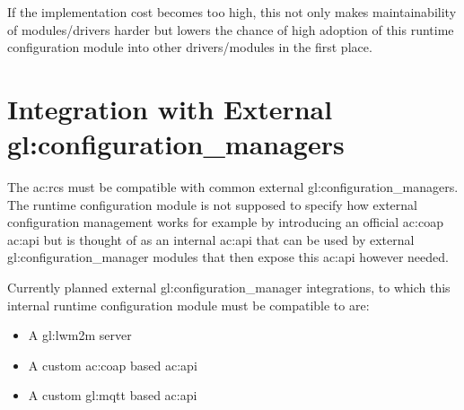 If the implementation cost becomes too high, this not only makes maintainability of modules/drivers harder but lowers the chance of high adoption of this runtime configuration module into other drivers/modules in the first place.

\section{Integration with External \glspl*{gl:configuration_manager}}
\label{sec:requirements:integration_with_external_configuration_managers}

The \gls{ac:rcs} must be compatible with common external \glspl{gl:configuration_manager}.
The runtime configuration module is not supposed to specify how external configuration management works for example by introducing an official \gls{ac:coap} \gls{ac:api} but is thought of as an internal \gls{ac:api} that can be used by external \gls{gl:configuration_manager} modules that then expose this \gls{ac:api} however needed.

Currently planned external \gls{gl:configuration_manager} integrations, to which this internal
runtime configuration module must be compatible to are:

\begin{itemize}
    \item A \gls{gl:lwm2m} server \cite{oma-lwm2m-core-12}
    \item A custom \gls{ac:coap} based \gls{ac:api} \cite{RFC-7252}
    \item A custom \gls{gl:mqtt} based \gls{ac:api} \cite{mqtt311}
\end{itemize}
